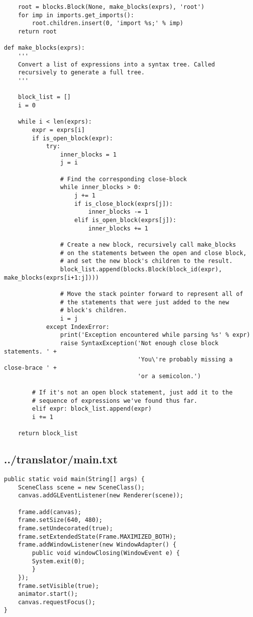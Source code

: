 \begin{lstlisting}
    root = blocks.Block(None, make_blocks(exprs), 'root')
    for imp in imports.get_imports():
        root.children.insert(0, 'import %s;' % imp)
    return root

def make_blocks(exprs):
    '''
    Convert a list of expressions into a syntax tree. Called
    recursively to generate a full tree.
    '''

    block_list = []
    i = 0

    while i < len(exprs):
        expr = exprs[i]
        if is_open_block(expr):
            try:
                inner_blocks = 1
                j = i

                # Find the corresponding close-block
                while inner_blocks > 0:
                    j += 1
                    if is_close_block(exprs[j]):
                        inner_blocks -= 1
                    elif is_open_block(exprs[j]):
                        inner_blocks += 1

                # Create a new block, recursively call make_blocks
                # on the statements between the open and close block,
                # and set the new block's children to the result.
                block_list.append(blocks.Block(block_id(expr), make_blocks(exprs[i+1:j])))

                # Move the stack pointer forward to represent all of
                # the statements that were just added to the new
                # block's children.
                i = j
            except IndexError:
                print('Exception encountered while parsing %s' % expr)
                raise SyntaxException('Not enough close block statements. ' +
                                      'You\'re probably missing a close-brace ' +
                                      'or a semicolon.')

        # If it's not an open block statement, just add it to the
        # sequence of expressions we've found thus far.
        elif expr: block_list.append(expr)
        i += 1

    return block_list
\end{lstlisting}

\subsection*{../translator/main.txt}
\begin{lstlisting}
public static void main(String[] args) {
    SceneClass scene = new SceneClass();
    canvas.addGLEventListener(new Renderer(scene));

    frame.add(canvas);
    frame.setSize(640, 480);
    frame.setUndecorated(true);
    frame.setExtendedState(Frame.MAXIMIZED_BOTH);
    frame.addWindowListener(new WindowAdapter() {
	    public void windowClosing(WindowEvent e) {
		System.exit(0);
	    }
	});
    frame.setVisible(true);
    animator.start();
    canvas.requestFocus();
}\end{lstlisting}

